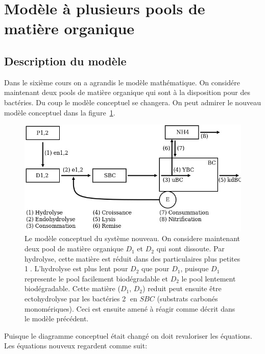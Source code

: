 \newpage
\section{Mod\`ele \`a plusieurs pools de matière organique}
\subsection{Description du mod\`ele}

\par{
Dans le sixième cours on a agrandis le modèle mathématique. On considére maintenant deux pools de
matière organique qui sont à la disposition pour des bact\'eries. Du coup le modèle conceptuel se changera.
On peut admirer le nouveau modèle conceptuel dans la figure~\ref{fig:partie2diagconc}.
}

\begin{figure}[h!]
  \includegraphics[width=\textwidth]{partie2/scan1.jpg}
  \caption{Le modèle conceptuel du système nouveau. On considere maintenant deux pool de matière organique
$D_1$ et $D_2$ qui sont dissoute. Par hydrolyse, cette matière est réduit dans des particulaires plus petites
\textcircled{1}. L'hydrolyse est plus lent pour $D_2$ que pour $D_1$, puisque $D_1$ represente le pool
facilement biodégradable et $D_2$ le pool lentement biodégradable. Cette matière ($D_1$, $D_2$) reduit peut
ensuite être ectohydrolyse par les bactéries \textcircled{2} en $SBC$ (substrats carbonés monomériques).
Ceci est ensuite amené à réagir comme décrit dans le modèle précédent.
}
  \label{fig:partie2diagconc}
\end{figure}

\par{
Puisque le diagramme conceptuel était changé on doit revaloriser les équations. Les
équations nouveux regardent comme suit:
}

